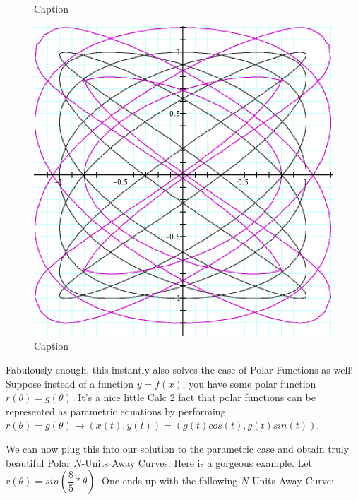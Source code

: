 \begin{figure}[H]
\begin{minipage}[b]{0.4\linewidth}
    \caption{Caption} 
    \label{fig:fig33}
    \vspace{4ex}
  \end{minipage} %
    \begin{minipage}[b]{0.4\linewidth}
    \centering
    \includegraphics[width=.9\linewidth]{parametric-polar-img/Fig 34.png} 
    \caption{Caption} 
    \label{fig:fig34}
    \vspace{4ex}
  \end{minipage} %
\end{figure}

Fabulously enough, this instantly also solves the case of Polar Functions as well! Suppose instead of a function $y = f(x)$, you have some polar function $r( \theta ) = g( \theta )$. It’s a nice little Calc 2 fact that polar functions can be represented as parametric equations by performing $r(\theta) = g(\theta) \xrightarrow{} (x(t), y(t)) = (g(t) cos(t), g(t) sin(t))$.

We can now plug this into our solution to the parametric case and obtain truly beautiful Polar $N$-Units Away Curves. Here is a gorgeous example. Let $r (\theta) = sin(\dfrac{8}{5} * \theta)$. One ends up with the following $N$-Units Away Curve:


